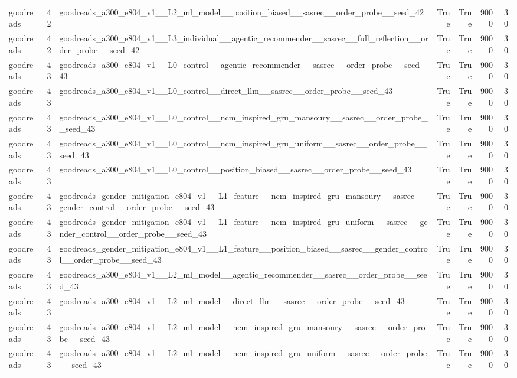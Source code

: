 \begin{table}[htbp!]
\begin{tabular}{lrlrrrr}
goodreads & 42 & goodreads\_a300\_e804\_v1\_\_L2\_ml\_model\_\_position\_biased\_\_sasrec\_\_order\_probe\_\_seed\_42 & True & True & 9000 & 30 \\
goodreads & 42 & goodreads\_a300\_e804\_v1\_\_L3\_individual\_\_agentic\_recommender\_\_sasrec\_\_full\_reflection\_\_order\_probe\_\_seed\_42 & True & True & 9000 & 30 \\
goodreads & 43 & goodreads\_a300\_e804\_v1\_\_L0\_control\_\_agentic\_recommender\_\_sasrec\_\_order\_probe\_\_seed\_43 & True & True & 9000 & 30 \\
goodreads & 43 & goodreads\_a300\_e804\_v1\_\_L0\_control\_\_direct\_llm\_\_sasrec\_\_order\_probe\_\_seed\_43 & True & True & 9000 & 30 \\
goodreads & 43 & goodreads\_a300\_e804\_v1\_\_L0\_control\_\_ncm\_inspired\_gru\_mansoury\_\_sasrec\_\_order\_probe\_\_seed\_43 & True & True & 9000 & 30 \\
goodreads & 43 & goodreads\_a300\_e804\_v1\_\_L0\_control\_\_ncm\_inspired\_gru\_uniform\_\_sasrec\_\_order\_probe\_\_seed\_43 & True & True & 9000 & 30 \\
goodreads & 43 & goodreads\_a300\_e804\_v1\_\_L0\_control\_\_position\_biased\_\_sasrec\_\_order\_probe\_\_seed\_43 & True & True & 9000 & 30 \\
goodreads & 43 & goodreads\_gender\_mitigation\_e804\_v1\_\_L1\_feature\_\_ncm\_inspired\_gru\_mansoury\_\_sasrec\_\_gender\_control\_\_order\_probe\_\_seed\_43 & True & True & 9000 & 30 \\
goodreads & 43 & goodreads\_gender\_mitigation\_e804\_v1\_\_L1\_feature\_\_ncm\_inspired\_gru\_uniform\_\_sasrec\_\_gender\_control\_\_order\_probe\_\_seed\_43 & True & True & 9000 & 30 \\
goodreads & 43 & goodreads\_gender\_mitigation\_e804\_v1\_\_L1\_feature\_\_position\_biased\_\_sasrec\_\_gender\_control\_\_order\_probe\_\_seed\_43 & True & True & 9000 & 30 \\
goodreads & 43 & goodreads\_a300\_e804\_v1\_\_L2\_ml\_model\_\_agentic\_recommender\_\_sasrec\_\_order\_probe\_\_seed\_43 & True & True & 9000 & 30 \\
goodreads & 43 & goodreads\_a300\_e804\_v1\_\_L2\_ml\_model\_\_direct\_llm\_\_sasrec\_\_order\_probe\_\_seed\_43 & True & True & 9000 & 30 \\
goodreads & 43 & goodreads\_a300\_e804\_v1\_\_L2\_ml\_model\_\_ncm\_inspired\_gru\_mansoury\_\_sasrec\_\_order\_probe\_\_seed\_43 & True & True & 9000 & 30 \\
goodreads & 43 & goodreads\_a300\_e804\_v1\_\_L2\_ml\_model\_\_ncm\_inspired\_gru\_uniform\_\_sasrec\_\_order\_probe\_\_seed\_43 & True & True & 9000 & 30 \\

\end{tabular}
\end{table}
